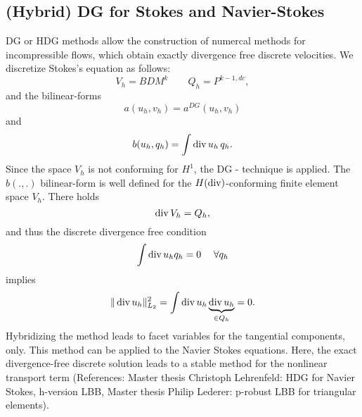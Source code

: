 \subsection{(Hybrid) DG for Stokes and Navier-Stokes}
%
DG or HDG methods allow the construction of numercal methods for
incompressible flows, which
obtain exactly divergence free discrete velocities. We discretize
Stokes's equation as follows:
$$
V_h = BDM^k \qquad Q_h = P^{k-1,dc},
$$
and the bilinear-forms
$$
a(u_h, v_h) = a^{DG} (u_h, v_h)
$$
and
$$
b(u_h, q_h) = \int \operatorname{div} u_h \, q_h.
$$
Since the space $V_h$ is not conforming for $H^1$, the DG - technique
is applied. The $b(.,.)$ bilinear-form is well defined for the
$H(\operatorname{div})$-conforming finite element space $V_h$. There holds
$$
\operatorname{div} V_h = Q_h,
$$
and thus the discrete divergence free condition
$$
\int \operatorname{div} u_h q_h = 0 \; \quad \forall q_h
$$
implies
$$
\| \operatorname{div} u_h \|_{L_2}^2 = \int \operatorname{div} u_h \underbrace {\operatorname{div}
  u_h}_{\in Q_h} = 0.
$$
Hybridizing the method leads to facet variables for the tangential
components, only. This method can be applied to the Navier Stokes
equations. Here, the exact divergence-free discrete solution leads to
a stable method for the nonlinear transport term (References: Master
thesis Christoph Lehrenfeld: HDG for Navier Stokes, h-version LBB, 
Master thesis Philip Lederer: p-robust LBB for triangular elements).

